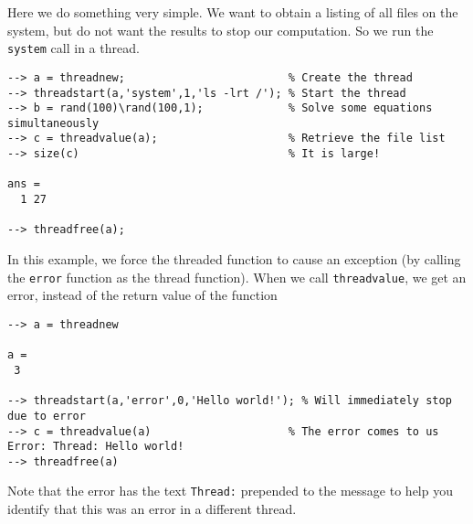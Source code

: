 Here we do something very simple.  We want to obtain a listing of
all files on the system, but do not want the results to stop our
computation.  So we run the \verb|system| call in a thread.
\begin{verbatim}
--> a = threadnew;                         % Create the thread
--> threadstart(a,'system',1,'ls -lrt /'); % Start the thread
--> b = rand(100)\rand(100,1);             % Solve some equations simultaneously
--> c = threadvalue(a);                    % Retrieve the file list
--> size(c)                                % It is large!

ans = 
  1 27 

--> threadfree(a);
\end{verbatim}
In this example, we force the threaded function to cause an
exception (by calling the \verb|error| function as the thread 
function).  When we call \verb|threadvalue|, we get an error, instead
of the return value of the function
\begin{verbatim}
--> a = threadnew

a = 
 3 

--> threadstart(a,'error',0,'Hello world!'); % Will immediately stop due to error
--> c = threadvalue(a)                     % The error comes to us
Error: Thread: Hello world!
--> threadfree(a)
\end{verbatim}
Note that the error has the text \verb|Thread:| prepended to the message
to help you identify that this was an error in a different thread.
